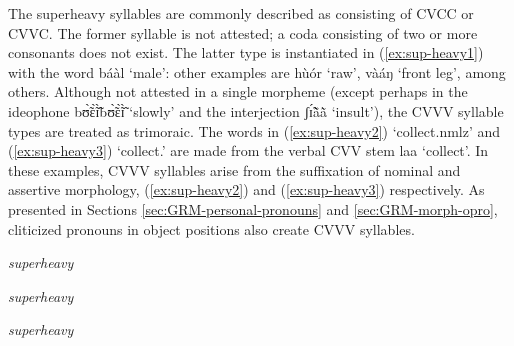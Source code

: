 The superheavy syllables are commonly described as consisting of CVCC or CVVC.
The former syllable is not attested; a coda consisting of two or more consonants
does not exist. The latter type is instantiated in (\ref{ex:sup-heavy1}) with
 the word {\sls báàl} `male':  other examples are {\sls hùór} `raw',  
{\sls vàáŋ} `front leg', among others.  Although not attested in a single
morpheme (except perhaps in the ideophone {\sls  bʊ̃̀ɛ̃̀ɪ̃̀bʊ̃̀ɛ̃̀ɪ̃̀} `slowly' 
and the interjection {\sls ʃɪ̃́ã̀ã̀} `insult'),    the CVVV syllable types are 
treated as trimoraic. The words in
(\ref{ex:sup-heavy2}) `collect.{\sc nmlz}'  and  (\ref{ex:sup-heavy3}) 
`collect.{\foc}'
are made from the verbal CVV stem {\sls laa} `collect'. In these examples,  
CVVV 
syllables
arise  from the suffixation of nominal 
and assertive  morphology, 
(\ref{ex:sup-heavy2}) and (\ref{ex:sup-heavy3}) respectively. As presented in 
Sections
\ref{sec:GRM-personal-pronouns} and \ref{sec:GRM-morph-opro}, cliticized
pronouns in object positions also
create CVVV syllables.


\begin{exe}
\ex\label{exe:superheavy}
\begin{multicols}{3}
\begin{xlist}

\ex\label{ex:sup-heavy1}{\it superheavy}\\
{}


\ex\label{ex:sup-heavy2}{\it superheavy}\\
{}



\ex\label{ex:sup-heavy3}{\it superheavy}\\
{}

\end{xlist}
\end{multicols}
\end{exe}

